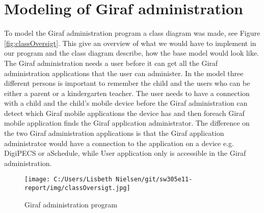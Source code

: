 \section{Modeling of Giraf administration}
To model the Giraf administration program a class diagram was made, see Figure \vref{fig:classOversigt}. This give an overview of what we would have to implement in our program and the class diagram describe, how the base model would look like. The Giraf administration needs a user before it can get all the Giraf administration applications that the user can administer. In the model three different persons is important to remember the child and the users who can be either a parent or a kindergarten teacher. The user needs to have a connection with a child and the child's mobile device before the Giraf administration can detect which Giraf mobile applications the device has and then foreach Giraf mobile application finds the Giraf application administrator. The difference on the two Giraf administration applications is that the Giraf application administrator would have a connection to the application on a device e.g. DigiPECS or aSchedule, while User application only is accessible in the Giraf administration.

\begin{figure}[ht]
	\centering
		\texttt{[image: C:/Users/Lisbeth Nielsen/git/sw305e11-report/img/classOversigt.jpg]}
	\caption{Giraf administration program}
	\label{fig:classOversigt}
\end{figure}
